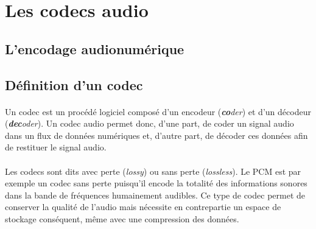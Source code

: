 \documentclass{article}
\begin{document}






    \newpage
    \section{Les codecs audio}
    \subsection{L'encodage audionumérique}
    \label{audionumerique}

    \subsection{Définition d'un codec}
    \paragraph{}
    Un codec est un procédé logiciel composé d'un encodeur (\emph{\textbf{co}der}) et d'un décodeur (\emph{\textbf{dec}oder})\cite{wiki:codec}. Un codec audio permet donc, d'une part, de coder un signal audio dans un flux de données numériques et, d'autre part, de décoder ces données afin de restituer le signal audio.

    \paragraph{}
    Les codecs sont dits avec perte (\emph{lossy}) ou sans perte (\emph{lossless}). Le PCM est par exemple un codec sans perte puisqu'il encode la totalité des informations sonores dans la bande de fréquences humainement audibles. Ce type de codec permet de conserver la qualité de l'audio mais nécessite en contrepartie un espace de stockage conséquent, même avec une compression des données\cite{}.
    
\end{document}
